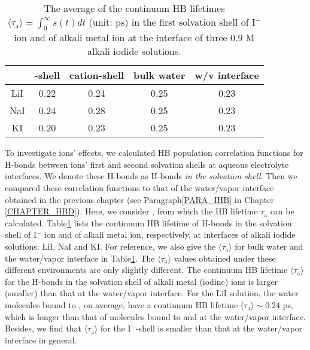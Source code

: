 \begin{table}[H]
\centering
\caption{\label{tab:tau_hb_alkali_iodine} 
The average of the continuum HB lifetimes $\langle\tau_{\text{a}}\rangle=\int_0^\infty s(t) dt$ (unit: ps) in the first solvation shell of I$^-$ ion 
and of alkali metal ion at the interface of three 0.9 M alkali iodide solutions.
}
\begin{tabular}{ccccc}
  &\I-shell &cation-shell & bulk water & w/v interface \\
\hline
 LiI & 0.22 & 0.24 & 0.25 & 0.23\\
 NaI & 0.24 & 0.28 & 0.25 & 0.23\\
 KI  & 0.20 & 0.23 & 0.25 &0.23\\
\end{tabular}
\end{table} 

To investigate ions' effects, we calculated HB population correlation functions for H-bonds between 
ions' first and second solvation shells at aqueous electrolyte interfaces.
We denote these H-bonds as H-bonds \emph{in the solvation shell}.
Then we compared these correlation functions to that of the water/vapor interface obtained in the previous chapter 
(see Paragraph\thinspace\ref{PARA_IHB} in Chapter \ref{CHAPTER_HBD}). 
Here, we consider \SHB, from which the HB lifetime $\tau_\text{a}$ can be calculated.
Table\thinspace\ref{tab:tau_hb_alkali_iodine} lists the continuum HB lifetime of H-bonds in the solvation shell 
of I$^-$ ion and of alkali metal ion, respectively, at interfaces of alkali iodide solutions: LiI, NaI and KI. 
For reference, we also give the $\langle\tau_\text{a}\rangle$ for bulk water and the water/vapor interface in Table\thinspace\ref{tab:tau_hb_alkali_iodine}.
The $\langle\tau_\text{a}\rangle$ values obtained under these different environments are only slightly different.
The continuum HB lifetime $\langle\tau_{\text{a}}\rangle$ for the H-bonds in the 
solvation shell of alkali metal (iodine) ions is larger (smaller) than 
that at the water/vapor interface. 
For the LiI solution, the water molecules bound to \Li, on average, have a continuum HB lifetime $\langle\tau_{\text{a}}\rangle \sim 0.24$ ps,
which is longer than that of molecules bound to \I and at the water/vapor interface. 
Besides, we find that $\langle\tau_{\text{a}}\rangle$ for the I$^-$-shell is smaller than that at the water/vapor interface in general.



